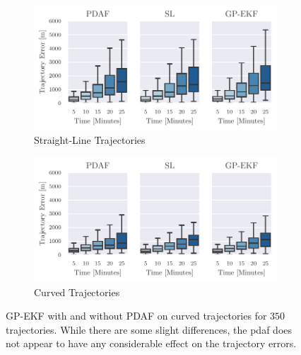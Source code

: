 \begin{figure}[h]
    \centering
    \begin{subfigure}{1\textwidth}
        \includegraphics[width=\textwidth]{figures/straight_line_stats/gp_vs_update.pdf}
        \caption{Straight-Line Trajectories}
    \end{subfigure}
    \begin{subfigure}{1\textwidth}
        \includegraphics[width=\textwidth]{figures/curved_line_stats/gp_vs_update.pdf}
        \caption{Curved Trajectories}
    \end{subfigure}
    \caption{GP-EKF with and without PDAF on curved trajectories for $350$ trajectories. While there are some slight differences, the \acrshort{pdaf} does not appear to have any considerable effect on the trajectory errors.}
    \label{fig:stats_gp_ekf_with_or_without_update}
\end{figure}

